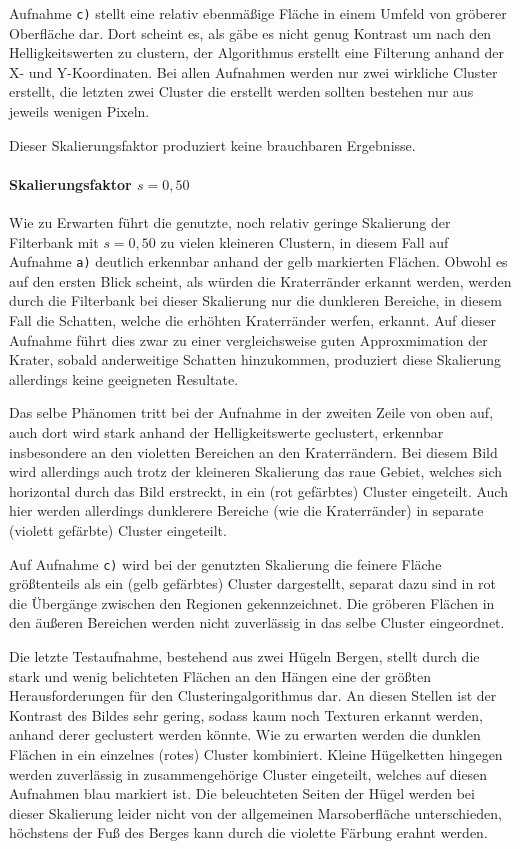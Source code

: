 Aufnahme \texttt{c)} stellt eine relativ ebenmäßige Fläche in einem Umfeld von gröberer Oberfläche dar. Dort scheint es, als gäbe es nicht genug Kontrast um nach den Helligkeitswerten zu clustern, der Algorithmus erstellt eine Filterung anhand der X- und Y-Koordinaten. Bei allen Aufnahmen werden nur zwei wirkliche Cluster erstellt, die letzten zwei Cluster die erstellt werden sollten bestehen nur aus jeweils wenigen Pixeln.

Dieser Skalierungsfaktor produziert keine brauchbaren Ergebnisse.

\paragraph{Skalierungsfaktor $s=0,50$}

Wie zu Erwarten führt die genutzte, noch relativ geringe Skalierung der Filterbank mit $s=0,50$ zu vielen kleineren Clustern, in diesem Fall auf Aufnahme \texttt{a)} deutlich erkennbar anhand der gelb markierten Flächen. Obwohl es auf den ersten Blick scheint, als würden die Kraterränder erkannt werden, werden durch die Filterbank bei dieser Skalierung nur die dunkleren Bereiche, in diesem Fall die Schatten, welche die erhöhten Kraterränder werfen, erkannt. Auf dieser Aufnahme führt dies zwar zu einer vergleichsweise guten Approxmimation der Krater, sobald anderweitige Schatten hinzukommen, produziert diese Skalierung allerdings keine geeigneten Resultate.

Das selbe Phänomen tritt bei der Aufnahme in der zweiten Zeile von oben auf, auch dort wird stark anhand der Helligkeitswerte geclustert, erkennbar insbesondere an den violetten Bereichen an den Kraterrändern. Bei diesem Bild wird allerdings auch trotz der kleineren Skalierung das raue Gebiet, welches sich horizontal durch das Bild erstreckt, in ein (rot gefärbtes) Cluster eingeteilt. Auch hier werden allerdings dunklerere Bereiche (wie die Kraterränder) in separate (violett gefärbte) Cluster eingeteilt.

Auf Aufnahme \texttt{c)} wird bei der genutzten Skalierung die feinere Fläche größtenteils als ein (gelb gefärbtes) Cluster dargestellt, separat dazu sind in rot die Übergänge zwischen den Regionen gekennzeichnet. Die gröberen Flächen in den äußeren Bereichen werden nicht zuverlässig in das selbe Cluster eingeordnet.

Die letzte Testaufnahme, bestehend aus zwei Hügeln \bzw Bergen, stellt durch die stark und wenig belichteten Flächen an den Hängen eine der größten Herausforderungen für den Clusteringalgorithmus dar. An diesen Stellen ist der Kontrast des Bildes sehr gering, sodass kaum noch Texturen erkannt werden, anhand derer geclustert werden könnte. Wie zu erwarten werden die dunklen Flächen in ein einzelnes (rotes) Cluster kombiniert. Kleine Hügelketten hingegen werden zuverlässig in zusammengehörige Cluster eingeteilt, welches auf diesen Aufnahmen blau markiert ist. Die beleuchteten Seiten der Hügel werden bei dieser Skalierung leider nicht von der allgemeinen Marsoberfläche unterschieden, höchstens der Fuß des Berges kann durch die violette Färbung erahnt werden.


